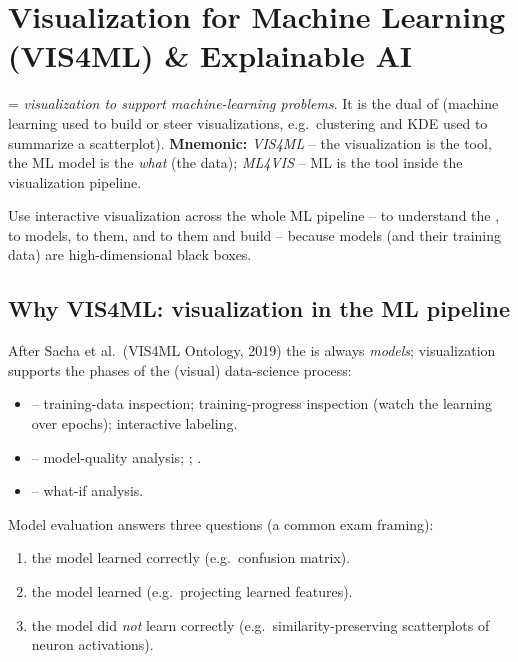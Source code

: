 \section{Visualization for Machine Learning (VIS4ML) \& Explainable AI}

 = \emph{visualization to support machine-learning problems}. It is
the dual of  (machine learning used to build or steer
visualizations, e.g.\ clustering and KDE used to summarize a scatterplot).
\textbf{Mnemonic:} \emph{VIS4ML} -- the visualization is the tool, the ML model
is the \emph{what} (the data); \emph{ML4VIS} -- ML is the tool inside the
visualization pipeline.

\begin{keybox}
Use interactive visualization across the whole ML pipeline -- to understand the
, to  models, to  them, and to
 them and build  -- because models (and their
training data) are high-dimensional black boxes.
\end{keybox}

\subsection{Why VIS4ML: visualization in the ML pipeline}

After Sacha et al.\ (VIS4ML Ontology, 2019) the  is always
\emph{models}; visualization supports the phases of the (visual) data-science
process:

\begin{itemize}
  \item {} -- training-data inspection; training-progress inspection
    (watch the learning over epochs); interactive labeling.
  \item {} -- model-quality analysis; ;
    .
  \item {} -- what-if analysis.
\end{itemize}

Model evaluation answers three questions (a common exam framing):
\begin{enumerate}[label=(\arabic*)]
  \item {} the model learned correctly (e.g.\ confusion matrix).
  \item {} the model learned (e.g.\ projecting learned features).
  \item {} the model did \emph{not} learn correctly (e.g.\
    similarity-preserving scatterplots of neuron activations).
\end{enumerate}

